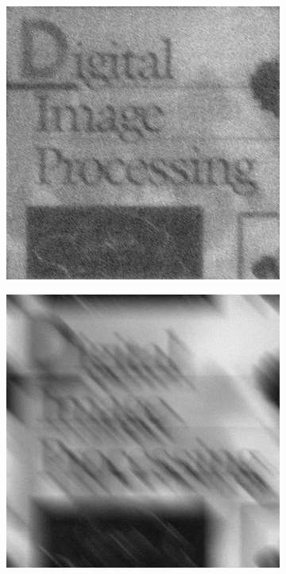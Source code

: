 \begin{figure}[h]
\begin{subfigure}[b]{0.3\linewidth}
		\caption{}
		\label{fig:5_inverse_650}
	\end{subfigure}
  	\begin{subfigure}[b]{0.3\linewidth}
		\includegraphics[width=\linewidth]{myfigure/p5/5_wiener_650.png}
		\caption{}
		\label{fig:5_wiener_650}
	\end{subfigure}
	\begin{subfigure}[b]{0.3\linewidth}
		\includegraphics[width=\linewidth]{myfigure/p5/5_blur_gaussian_65.png}

\end{subfigure}
\end{figure}
